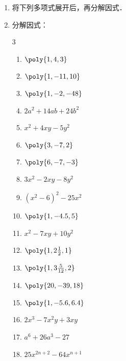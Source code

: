 \begin{enumerate}
\begin{multicols}{2}
    \begin{enumerate}
    \item $1-x-y+xy$
    \item $x^3-x+x^2-1$
    \item $ab-bc-b^2+ca$
    \item $ax+y-ay-x$
    \item $x^2+ax-y^2+ay$
    \item $x^3+x^2y-x^2z-xyz$
    \item $ax^2+bx^2-bx-ax+cx^2-cx$
    \item $x^3+9+3x^2+3x$
\end{enumerate}
\end{multicols}
    \item 将下列多项式展开后，再分解因式．
\begin{enumerate}
\end{enumerate}
    \item 分解因式：
\begin{multicols}{3}
\begin{enumerate}
    \item $\poly{1,4,3}$
    \item $\poly{1,-11,10}$
    \item $\poly{1,-2,-48}$
    \item $2a^2+14ab+24b^2$
    \item $x^2+4xy-5y^2$
    \item $\poly{3,-7,2}$
    \item $\poly{6,-7,-3}$
    \item $3x^2 − 2xy − 8y^2$
    \item $(x^2-6)^2-25x^2$
    \item $\poly{1,-4.5,5}$
    \item $x^2 −7xy+10y^2$
    \item $\poly{1,2\frac{1}{2},1}$
    \item $\poly{1,3\frac{5}{12},2}$
    \item $\poly{20,-39,18}$
    \item $\poly{1,-5.6,6.4}$
    \item $2x^3 − 7x^2y + 3xy$
    \item $a^6+26a^3-27$
    \item $25x^{2n+2}-64x^{n+1}$

\end{enumerate}
\end{multicols}
\end{enumerate}
